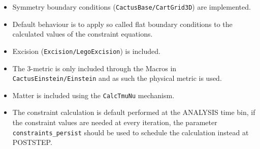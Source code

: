 \documentclass{article}
\begin{document}
\begin{itemize}

\item Symmetry boundary conditions ({\tt CactusBase/CartGrid3D}) are implemented.

\item Default behaviour is to apply so called flat boundary conditions to the calculated values of the constraint equations.

\item Excision ({\tt Excision/LegoExcision}) is included.

\item The 3-metric is only included through the Macros in {\tt CactusEinstein/Einstein} and as such the physical metric is used.

\item Matter is included using the {\tt CalcTmuNu} mechanism.

\item The constraint calculation is default performed at the ANALYSIS time bin, if the constraint values are needed at every iteration, the parameter {\tt constraints\_persist} should be used to schedule the calculation instead at POSTSTEP.

\end{itemize}

\end{document}
